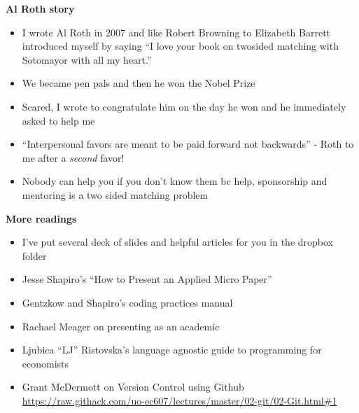 \documentclass[notes=show]{beamer}
\begin{document}
\begin{frame}[plain]
\begin{center}
\textbf{Al Roth story}
\end{center}

\begin{itemize}
\item I wrote Al Roth in 2007 and like Robert Browning to Elizabeth Barrett introduced myself by saying ``I love your book on twosided matching with Sotomayor with all my heart.''
\item We became pen pals and then he won the Nobel Prize
\item Scared, I wrote to congratulate him on the day he won and he immediately asked to help me 
\item ``Interpersonal favors are meant to be paid forward not backwards'' - Roth to me after a \emph{second} favor!
\item Nobody can help you if you don't know them bc help, sponsorship and mentoring is a two sided matching problem
\end{itemize}

\end{frame}


\begin{frame}[plain]
\begin{center}
\textbf{More readings}
\end{center}

\begin{itemize}
\item I've put several deck of slides and helpful articles for you in the dropbox folder
\item Jesse Shapiro's ``How to Present an Applied Micro Paper''
\item Gentzkow and Shapiro's coding practices manual
\item Rachael Meager on presenting as an academic
\item Ljubica ``LJ'' Ristovska's language agnostic guide to programming for economists
\item Grant McDermott on Version Control using Github \url{https://raw.githack.com/uo-ec607/lectures/master/02-git/02-Git.html\#1}

\end{itemize}

\end{frame}
\end{document}
